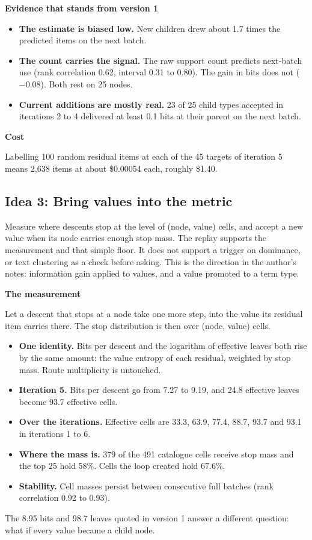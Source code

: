 \documentclass[10pt,a4paper]{article}
\newcommand{\lab}[1]{\par\vspace{0.35em}\textbf{#1}\par\nobreak}
\begin{document}
\lab{Evidence that stands from version 1}
\begin{itemize}
\item \textbf{The estimate is biased low.} New children drew about 1.7 times the predicted items on the next batch.
\item \textbf{The count carries the signal.} The raw support count predicts next-batch use (rank correlation 0.62, interval 0.31 to 0.80). The gain in bits does not ($-0.08$). Both rest on 25 nodes.
\item \textbf{Current additions are mostly real.} 23 of 25 child types accepted in iterations 2 to 4 delivered at least 0.1 bits at their parent on the next batch.
\end{itemize}

\lab{Cost}
Labelling 100 random residual items at each of the 45 targets of iteration 5 means 2,638 items at about
\$0.00054 each, roughly \$1.40.

\subsection{Idea 3: Bring values into the metric}

Measure where descents stop at the level of (node, value) cells, and accept a new value when its node
carries enough stop mass. The replay supports the measurement and that simple floor. It does not support a
trigger on dominance, or text clustering as a check before asking. This is the direction in the author's
notes: information gain applied to values, and a value promoted to a term type.

\lab{The measurement}
Let a descent that stops at a node take one more step, into the value its residual item carries there. The
stop distribution is then over (node, value) cells.
\begin{itemize}
\item \textbf{One identity.} Bits per descent and the logarithm of effective leaves both rise by the same amount: the value entropy of each residual, weighted by stop mass. Route multiplicity is untouched.
\item \textbf{Iteration 5.} Bits per descent go from 7.27 to 9.19, and 24.8 effective leaves become 93.7 effective cells.
\item \textbf{Over the iterations.} Effective cells are 33.3, 63.9, 77.4, 88.7, 93.7 and 93.1 in iterations 1 to 6.
\item \textbf{Where the mass is.} 379 of the 491 catalogue cells receive stop mass and the top 25 hold 58\%. Cells the loop created hold 67.6\%.
\item \textbf{Stability.} Cell masses persist between consecutive full batches (rank correlation 0.92 to 0.93).
\end{itemize}
The 8.95 bits and 98.7 leaves quoted in version 1 answer a different question: what if every value became a
child node.
\end{document}
